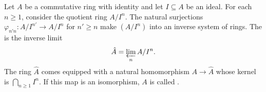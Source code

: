 Let $A$ be a commutative ring with identity and let $I \subseteq A$ be an ideal. For each $n \geq 1$, consider the quotient ring $A/I^n$. The natural surjections $\varphi_{n'n}: A/I^{n'} \to A/I^n$ for $n' \geq n$ make $(A/I^n)$ into an inverse system of rings. The  is the inverse limit
$$\hat{A} = \varprojlim_{n} A/I^n.$$
The ring $\hat{A}$ comes equipped with a natural homomorphism $A \to \hat{A}$ whose kernel is $\bigcap_{n \geq 1} I^n$. If this map is an isomorphism, $A$ is called .
